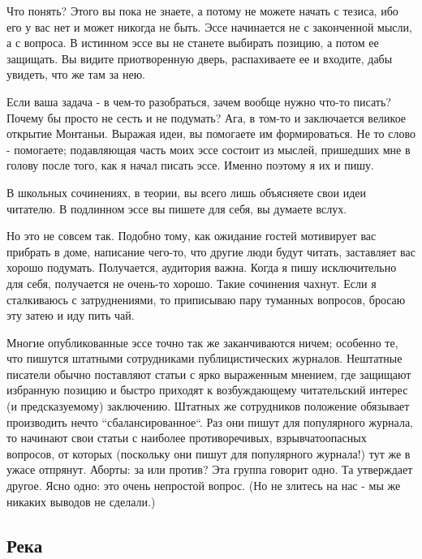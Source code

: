 \documentclass[ebook,12pt,oneside,openany]{memoir}
\begin{document}
Что понять? Этого вы пока не знаете, а потому не можете начать с
тезиса, ибо его у вас нет и может никогда не быть. Эссе начинается не
с законченной мысли, а с вопроса. В истинном эссе вы не станете
выбирать позицию, а потом ее защищать. Вы видите приотворенную дверь,
распахиваете ее и входите, дабы увидеть, что же там за нею. \newline

Если ваша задача - в чем-то разобраться, зачем вообще нужно что-то
писать? Почему бы просто не сесть и не подумать? Ага, в том-то и
заключается великое открытие Монтаньи. Выражая идеи, вы помогаете им
формироваться. Не то слово - помогаете; подавляющая часть моих эссе
состоит из мыслей, пришедших мне в голову после того, как я начал
писать эссе. Именно поэтому я их и пишу. \newline

В школьных сочинениях, в теории, вы всего лишь объясняете свои идеи
читателю. В подлинном эссе вы пишете для себя, вы думаете вслух.
\newline

Но это не совсем так. Подобно тому, как ожидание гостей мотивирует вас
прибрать в доме, написание чего-то, что другие люди будут читать,
заставляет вас хорошо подумать. Получается, аудитория важна. Когда я
пишу исключительно для себя, получается не очень-то хорошо. Такие
сочинения чахнут. Если я сталкиваюсь с затруднениями, то приписываю
пару туманных вопросов, бросаю эту затею и иду пить чай. \newline

Многие опубликованные эссе точно так же заканчиваются ничем; особенно
те, что пишутся штатными сотрудниками публицистических журналов.
Нештатные писатели обычно поставляют статьи с ярко выраженным мнением,
где защищают избранную позицию и быстро приходят к возбуждающему
читательский интерес (и предсказуемому) заключению. Штатных же
сотрудников положение обязывает производить нечто
``сбалансированное``. Раз они пишут для популярного журнала, то
начинают свои статьи с наиболее противоречивых, взрывчатоопасных
вопросов, от которых (поскольку они пишут для популярного журнала!)
тут же в ужасе отпрянут. Аборты: за или против? Эта группа говорит
одно. Та утверждает другое. Ясно одно: это очень непростой вопрос. (Но
не злитесь на нас - мы же никаких выводов не сделали.) \newline

\subsection{Река}
\end{document}
